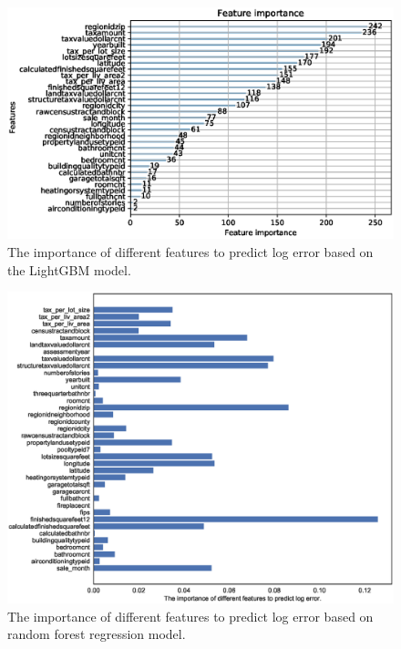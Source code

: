 \documentclass[12pt]{article}
\begin{document}
\begin{figure}[!ht]
	\centering
	\includegraphics[width=0.9\linewidth]{pic/feature_importance}
	\caption{The importance of different features to predict log error based on the LightGBM model.}
	\label{fig:feature_importance}
\end{figure}

\begin{figure}[!ht]
	\centering
	\includegraphics[width=0.9\linewidth]{pic/feature_importance_random_forest}
	\caption{The importance of different features to predict log error based on random forest regression model.}
	\label{fig:feature_importance_random_forest}
\end{figure}
\end{document}
